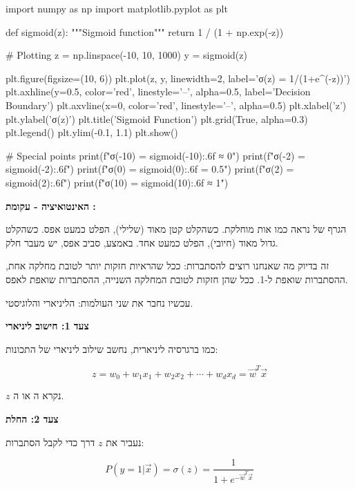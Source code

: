 \begin{pythonbox}
import numpy as np
import matplotlib.pyplot as plt

def sigmoid(z):
    """Sigmoid function"""
    return 1 / (1 + np.exp(-z))

# Plotting
z = np.linspace(-10, 10, 1000)
y = sigmoid(z)

plt.figure(figsize=(10, 6))
plt.plot(z, y, linewidth=2, label='σ(z) = 1/(1+e^(-z))')
plt.axhline(y=0.5, color='red', linestyle='--', alpha=0.5, label='Decision Boundary')
plt.axvline(x=0, color='red', linestyle='--', alpha=0.5)
plt.xlabel('z')
plt.ylabel('σ(z)')
plt.title('Sigmoid Function')
plt.grid(True, alpha=0.3)
plt.legend()
plt.ylim(-0.1, 1.1)
plt.show()

# Special points
print(f"σ(-10) = {sigmoid(-10):.6f}  ≈ 0")
print(f"σ(-2)  = {sigmoid(-2):.6f}")
print(f"σ(0)   = {sigmoid(0):.6f}   = 0.5")
print(f"σ(2)   = {sigmoid(2):.6f}")
print(f"σ(10)  = {sigmoid(10):.6f}  ≈ 1")
\end{pythonbox}

\textbf{האינטואיציה - עקומת :}

הגרף של  נראה כמו אות  מוחלקת. כשהקלט קטן מאוד (שלילי), הפלט כמעט אפס. כשהקלט גדול מאוד (חיובי), הפלט כמעט אחד. באמצע, סביב אפס, יש מעבר חלק.

זה בדיוק מה שאנחנו רוצים להסתברות: ככל שהראיות חזקות יותר לטובת מחלקה אחת, ההסתברות שואפת ל-\num{1}. ככל שהן חזקות לטובת המחלקה השנייה, ההסתברות שואפת לאפס.


עכשיו נחבר את שני העולמות: הליניארי והלוגיסטי.

\textbf{צעד \num{1}: חישוב ליניארי}

כמו ברגרסיה ליניארית, נחשב שילוב ליניארי של התכונות:

\begin{equation}
z = w_0 + w_1 x_1 + w_2 x_2 + \cdots + w_d x_d = \vec{w}^T\vec{x}
\end{equation}

$z$ נקרא ה\textbf{} או ה\textbf{}.

\textbf{צעד \num{2}: החלת }

נעביר את $z$ דרך  כדי לקבל הסתברות:

\begin{equation}
P(y=1|\vec{x}) = \sigma(z) = \frac{1}{1 + e^{-\vec{w}^T\vec{x}}}
\end{equation}

